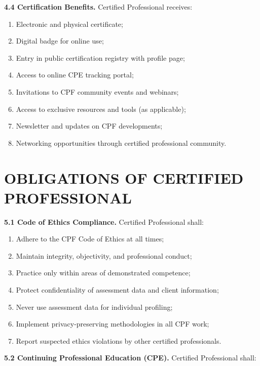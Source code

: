 \documentclass[11pt,a4paper]{article}
\begin{document}
\textbf{4.4 Certification Benefits.} Certified Professional receives:

\begin{enumerate}[label=\alph*)]
\item Electronic and physical certificate;
\item Digital badge for online use;
\item Entry in public certification registry with profile page;
\item Access to online CPE tracking portal;
\item Invitations to CPF community events and webinars;
\item Access to exclusive resources and tools (as applicable);
\item Newsletter and updates on CPF developments;
\item Networking opportunities through certified professional community.
\end{enumerate}

\section{OBLIGATIONS OF CERTIFIED PROFESSIONAL}

\textbf{5.1 Code of Ethics Compliance.} Certified Professional shall:

\begin{enumerate}[label=\alph*)]
\item Adhere to the CPF Code of Ethics at all times;
\item Maintain integrity, objectivity, and professional conduct;
\item Practice only within areas of demonstrated competence;
\item Protect confidentiality of assessment data and client information;
\item Never use assessment data for individual profiling;
\item Implement privacy-preserving methodologies in all CPF work;
\item Report suspected ethics violations by other certified professionals.
\end{enumerate}

\textbf{5.2 Continuing Professional Education (CPE).} Certified Professional shall:
\end{document}
